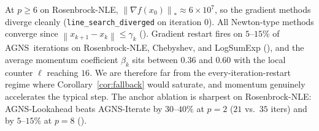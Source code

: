 \documentclass[conference]{IEEEtran}
\theoremstyle{remark}
\newcommand{\dnorm}[1]{\left\lVert#1\right\rVert_*}
\newcommand{\norm}[1]{\left\lVert#1\right\rVert}
\newcommand{\AGNS}{\textsc{AGNS}}
\begin{document}
At $p\ge 6$ on Rosenbrock-NLE, $\dnorm{\nabla f(x_0)} \approx
6\times 10^{7}$, so the gradient methods diverge cleanly
(\texttt{line\_search\_diverged} on iteration $0$). All Newton-type
methods converge since $\norm{x_{k+1}-x_k}\le\gamma_k$
(). Gradient restart fires on $5$--$15\%$ of
\AGNS\ iterations on Rosenbrock-NLE, Chebyshev, and LogSumExp
(), and the average momentum coefficient $\beta_k$
sits between $0.36$ and $0.60$ with the local counter $\ell$ reaching
$16$. We are therefore far from the every-iteration-restart regime
where Corollary~\ref{cor:fallback} would saturate, and momentum genuinely
accelerates the typical step. The anchor ablation is sharpest on
Rosenbrock-NLE: \AGNS-Lookahead beats \AGNS-Iterate by $30$--$40\%$
at $p=2$ ($21$ vs.\ $35$ iters) and by $5$--$15\%$ at $p=8$
().
\end{document}
